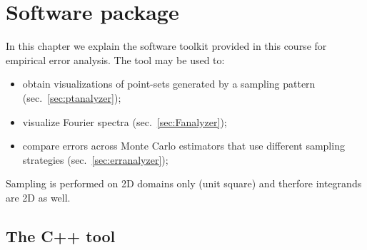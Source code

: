 
 \chapter{Software package}
In this chapter we explain the software toolkit provided in this course for empirical error analysis. The tool may be used to:
\begin{itemize}
 \item obtain visualizations of point-sets generated by a sampling pattern (sec.~\ref{sec:ptanalyzer});
 \item visualize Fourier spectra (sec.~\ref{sec:Fanalyzer}); 
 \item compare errors across Monte Carlo estimators that use different sampling strategies (sec.~\ref{sec:erranalyzer}); 
\end{itemize}
Sampling is performed on 2D domains only (unit square) and therfore integrands are 2D as well. 

\section{The C++ tool}
